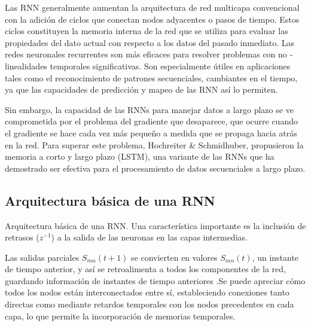 \vspace{1\baselineskip}
Las RNN generalmente aumentan la arquitectura de red multicapa convencional con la adición de ciclos que conectan nodos adyacentes o pasos de tiempo.  Estos ciclos constituyen la memoria interna de la red que se utiliza para
evaluar las propiedades del dato actual con respecto a los datos del pasado
inmediato. Las redes neuronales recurrentes son más eficaces para resolver problemas con no ­linealidades temporales significativas. Son especialmente útiles en aplicaciones tales como el reconocimiento de patrones secuenciales, cambiantes en el tiempo, ya que las capacidades de predicción y mapeo de las RNN así lo permiten\cite{montesdeoca2016estudios}.

\vspace{1\baselineskip}
Sin embargo, la capacidad de las RNNs para manejar datos a largo plazo se ve comprometida por el problema del gradiente que desaparece, que ocurre cuando el gradiente se hace cada vez más pequeño a medida que se propaga hacia atrás en la red. Para superar este problema, Hochreiter \& Schmidhuber, propusieron la memoria a corto y largo plazo (LSTM), una variante de las RNNs que ha demostrado ser efectiva para el procesamiento de datos secuenciales a largo plazo\cite{tomas2023prediccion}.

\subsection{Arquitectura básica de una RNN}
Arquitectura básica de una RNN. Una característica importante es la inclusión de retrasos ($z^{-1}$) a la salida de las neuronas en las capas intermedias.


\vspace{1\baselineskip}
Las salidas parciales $S_{mn}(t + 1)$ se convierten en valores $S_{mn}(t)$, un instante de tiempo anterior, y así se retroalimenta a todos los componentes de la red, guardando información de instantes de tiempo anteriores \cite{montesdeoca2016estudios}.Se puede apreciar cómo todos los nodos están interconectados entre sí, estableciendo conexiones tanto directas como mediante retardos temporales con los nodos precedentes en cada capa, lo que permite la incorporación de memorias temporales.

